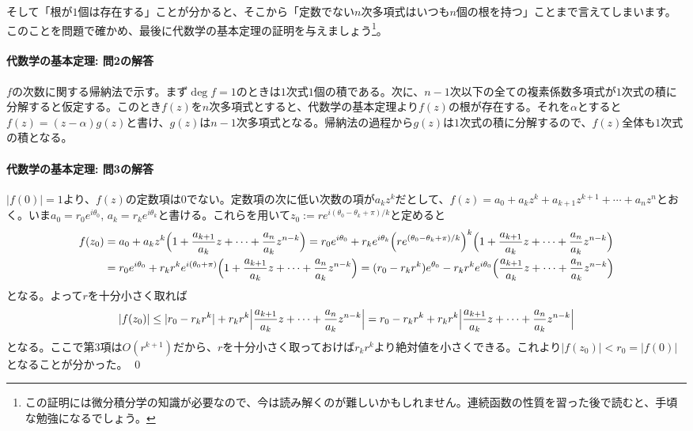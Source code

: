 そして「根が$1$個は存在する」ことが分かると、そこから「定数でない$n$次多項式はいつも$n$個の根を持つ」ことまで言えてしまいます。このことを問題で確かめ、最後に代数学の基本定理の証明を与えましょう\footnote{この証明には微分積分学の知識が必要なので、今は読み解くのが難しいかもしれません。連続函数の性質を習った後で読むと、手頃な勉強になるでしょう。}。

\paragraph{代数学の基本定理: 問2の解答}
$f$の次数に関する帰納法で示す。まず$\deg f=1$のときは$1$次式$1$個の積である。次に、$n-1$次以下の全ての複素係数多項式が$1$次式の積に分解すると仮定する。このとき$f(z)$を$n$次多項式とすると、代数学の基本定理より$f(z)$の根が存在する。それを$\alpha$とすると$f(z)=(z-\alpha)g(z)$と書け、$g(z)$は$n-1$次多項式となる。帰納法の過程から$g(z)$は$1$次式の積に分解するので、$f(z)$全体も$1$次式の積となる。


\paragraph{代数学の基本定理: 問3の解答}

$|f(0)|=1$より、$f(z)$の定数項は$0$でない。定数項の次に低い次数の項が$a_k z^k$だとして、$f(z) = a_0 + a_k z^k + a_{k+1} z^{k+1} + \cdots + a_n z^n$とおく。いま$a_0 = r_0 e^{i\theta_0}$, $a_k = r_k e^{i\theta_k}$と書ける。これらを用いて$z_0:=re^{i(\theta_0-\theta_k+\pi)/k}$と定めると
\begin{align*}
f(z_0) &= a_0 + a_k z^k \Bigl( 1 + \frac{a_{k+1}}{a_k} z + \cdots + \frac{a_n}{a_k} z^{n-k}\Bigr)
= r_0e^{i\theta_0} + r_k e^{i\theta_k} \Bigl(re^{(\theta_0-\theta_k+\pi)/k}\Bigr)^k \Bigl( 1 + \frac{a_{k+1}}{a_k} z + \cdots + \frac{a_n}{a_k} z^{n-k}\Bigr)\\
&= r_0e^{i\theta_0} + r_k r^k e^{i(\theta_0+\pi)} \Bigl( 1 + \frac{a_{k+1}}{a_k} z + \cdots + \frac{a_n}{a_k} z^{n-k}\Bigr)
= (r_0-r_kr^k) e^{\theta_0} - r_k r^k e^{i\theta_0} \Bigl( \frac{a_{k+1}}{a_k} z + \cdots + \frac{a_n}{a_k} z^{n-k}\Bigr)
\end{align*}
となる。よって$r$を十分小さく取れば
\begin{align*}
|f(z_0)| \leq |r_0-r_k r^k | + r_k r^k \Bigl| \frac{a_{k+1}}{a_k} z + \cdots + \frac{a_n}{a_k} z^{n-k}\Bigr|
= r_0-r_k r^k + r_k r^k \Bigl| \frac{a_{k+1}}{a_k} z + \cdots + \frac{a_n}{a_k} z^{n-k}\Bigr|
\end{align*}
となる。ここで第$3$項は$O(r^{k+1})$だから、$r$を十分小さく取っておけば$r_kr^k$より絶対値を小さくできる。これより$|f(z_0)|<r_0=|f(0)|$となることが分かった。 \qed


